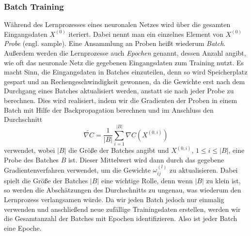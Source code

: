 \subsubsection{Batch Training}
Während des Lernprozesses eines neuronalen Netzes wird über die gesamten Eingangsdaten $X^{(0)}$ iteriert. Dabei nennt
man ein einzelnes Element von $X^{(0)}$ \textit{Probe} (engl. sample). Eine Ansammlung an Proben heißt wiederum
\textit{Batch}. Außerdem werden die Lernprozesse auch \textit{Epochen} genannt, dessen Anzahl angibt, wie oft das
neuronale Netz die gegebenen Eingangsdaten zum Training nutzt. Es macht Sinn, die Eingangsdaten in Batches einzuteilen,
denn so wird Speicherplatz gespart und an Rechengeschwindigkeit gewonnen, da die Gewichte erst nach dem Durchgang eines
Batches aktualisiert werden, anstatt sie nach jeder Probe zu berechnen. Dies wird realisiert, indem wir die Gradienten
der Proben in einem Batch mit Hilfe der Backpropagation berechnen und im Anschluss den Durchschnitt
\[
    \widetilde{\nabla C} = \frac{1}{|B|} \sum_{i=1}^{|B|} \nabla C(X^{(0,i)})
\]
verwendet, wobei $|B|$ die Größe der Batches angibt und $X^{(0,i)}$, $1 \leq i \leq |B|$, eine Probe des Batches $B$ ist.
Dieser Mittelwert wird dann durch das gegebene Gradientenverfahren verwendet, um die Gewichte $\omega_{ij}^{(l)}$ zu
aktualisieren. Dabei spielt die Größe der Batches $|B|$ eine wichtige Rolle, denn wenn $|B|$ zu klein ist, so werden die
Abschätzungen des Durchschnitts zu ungenau, was wiederum den Lernprozess verlangsamen würde. Da wir jeden Batch jedoch
nur einmalig verwenden und anschließend neue zufällige Trainingsdaten erstellen, werden wir die Gesamtanzahl der
Batches mit Epochen identifizieren. Also ist jeder Batch eine Epoche.

